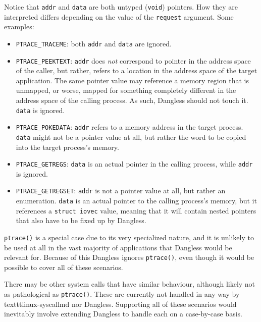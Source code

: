 Notice that \lstinline!addr! and \lstinline!data! are both untyped (\lstinline!void!) pointers. How they are interpreted differs depending on the value of the \lstinline!request! argument. Some examples:

\begin{itemize}
	\item \lstinline!PTRACE_TRACEME!: both \lstinline!addr! and \lstinline!data! are ignored.
	\item \lstinline!PTRACE_PEEKTEXT!: \lstinline!addr! does \emph{not} correspond to pointer in the address space of the caller, but rather, refers to a location in the address space of the target application. The same pointer value may reference a memory region that is unmapped, or worse, mapped for something completely different in the address space of the calling process. As such, Dangless should not touch it. \lstinline!data! is ignored.
	\item \lstinline!PTRACE_POKEDATA!: \lstinline!addr! refers to a memory address in the target process. \lstinline!data! might not be a pointer value at all, but rather the word to be copied into the target process's memory.
	\item \lstinline!PTRACE_GETREGS!: \lstinline!data! is an actual pointer in the calling process, while \lstinline!addr! is ignored.
	\item \lstinline!PTRACE_GETREGSET!: \lstinline!addr! is not a pointer value at all, but rather an enumeration. \lstinline!data! is an actual pointer to the calling process's memory, but it references a \lstinline!struct iovec! value, meaning that it will contain nested pointers that also have to be fixed up by Dangless.
\end{itemize}

\lstinline!ptrace()! is a special case due to its very specialized nature, and it is unlikely to be used at all in the vast majority of applications that Dangless would be relevant for. Because of this Dangless ignores \lstinline!ptrace()!, even though it would be possible to cover all of these scenarios.

There may be other system calls that have similar behaviour, although likely not as pathological as \lstinline!ptrace()!. These are currently not handled in any way by texttt{linux-syscallmd} nor Dangless. Supporting all of these scenarios would inevitably involve extending Dangless to handle each on a case-by-case basis.
